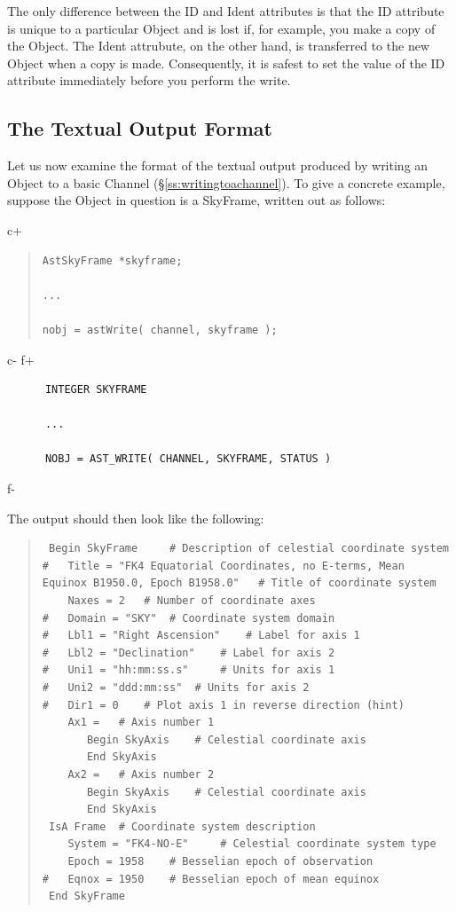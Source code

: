 \documentclass[twoside,11pt]{article}
\newcommand{\secref}[1]{\S\ref{#1}}
\newcommand{\secref}[1]{\ref{#1}}
\begin{document}
The only difference between the ID and Ident attributes is that the ID
attribute is unique to a particular Object and is lost if, for example,
you make a copy of the Object. The Ident attrubute, on the other hand, is
transferred to the new Object when a copy is made. Consequently, it is
safest to set the value of the ID attribute immediately before you
perform the write.

\subsection{\label{ss:textualoutputformat}The Textual Output Format}

Let us now examine the format of the textual output produced by
writing an Object to a basic Channel
(\secref{ss:writingtoachannel}). To give a concrete example, suppose
the Object in question is a SkyFrame, written out as follows:

c+
\begin{quote}
\small
\begin{verbatim}
AstSkyFrame *skyframe;

...

nobj = astWrite( channel, skyframe );
\end{verbatim}
\normalsize
\end{quote}
c-
f+
\small
\begin{verbatim}
      INTEGER SKYFRAME

      ...

      NOBJ = AST_WRITE( CHANNEL, SKYFRAME, STATUS )
\end{verbatim}
\normalsize
f-

The output should then look like the following:

\begin{quote}
\small
\begin{verbatim}
 Begin SkyFrame 	# Description of celestial coordinate system
#   Title = "FK4 Equatorial Coordinates, no E-terms, Mean Equinox B1950.0, Epoch B1958.0" 	# Title of coordinate system
    Naxes = 2 	# Number of coordinate axes
#   Domain = "SKY" 	# Coordinate system domain
#   Lbl1 = "Right Ascension" 	# Label for axis 1
#   Lbl2 = "Declination" 	# Label for axis 2
#   Uni1 = "hh:mm:ss.s" 	# Units for axis 1
#   Uni2 = "ddd:mm:ss" 	# Units for axis 2
#   Dir1 = 0 	# Plot axis 1 in reverse direction (hint)
    Ax1 = 	# Axis number 1
       Begin SkyAxis 	# Celestial coordinate axis
       End SkyAxis
    Ax2 = 	# Axis number 2
       Begin SkyAxis 	# Celestial coordinate axis
       End SkyAxis
 IsA Frame 	# Coordinate system description
    System = "FK4-NO-E" 	# Celestial coordinate system type
    Epoch = 1958 	# Besselian epoch of observation
#   Eqnox = 1950 	# Besselian epoch of mean equinox
 End SkyFrame
\end{verbatim}
\normalsize
\end{quote}
\end{document}
